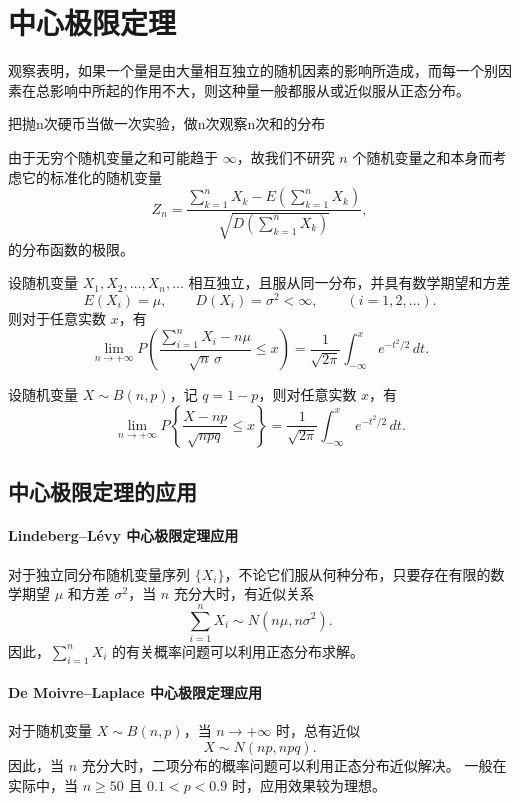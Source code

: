 \section{中心极限定理}
观察表明，如果一个量是由大量相互独立的随机因素的影响所造成，而每一个别因素在总影响中所起的作用不大，则这种量一般都服从或近似服从正态分布。
\begin{dxtips}
    把抛n次硬币当做一次实验，做n次观察n次和的分布
\end{dxtips}
由于无穷个随机变量之和可能趋于 $\infty$，故我们不研究 $n$ 个随机变量之和本身而考虑它的标准化的随机变量
\[
Z_n=\frac{\sum_{k=1}^n X_k - E\!\left(\sum_{k=1}^n X_k\right)}
{\sqrt{D\!\left(\sum_{k=1}^n X_k\right)}},
\]
的分布函数的极限。
\begin{theorem}
设随机变量 $X_1,X_2,\ldots,X_n,\ldots$ 相互独立，且服从同一分布，并具有数学期望和方差
\[
E(X_i)=\mu,\qquad D(X_i)=\sigma^2<\infty,\qquad (i=1,2,\ldots).
\]
则对于任意实数 $x$，有
\[
\lim_{n\to+\infty}
P\!\left(
\frac{\sum_{i=1}^n X_i-n\mu}{\sqrt{n}\,\sigma}
\le x
\right)
=
\frac{1}{\sqrt{2\pi}}
\int_{-\infty}^{x} e^{-t^2/2}\,dt.
\]
\end{theorem}
\begin{theorem}
设随机变量 $X\sim B(n,p)$，记 $q=1-p$，则对任意实数 $x$，有
\[
\lim_{n\to+\infty}
P\!\left\{
\frac{X-np}{\sqrt{npq}}\le x
\right\}
=
\frac{1}{\sqrt{2\pi}}
\int_{-\infty}^{x} e^{-t^{2}/2}\,dt .
\]
\end{theorem}

\subsection*{中心极限定理的应用}

\paragraph{Lindeberg--L\'evy 中心极限定理应用}
对于独立同分布随机变量序列 $\{X_i\}$，不论它们服从何种分布，只要存在有限的数学期望 $\mu$ 和方差 $\sigma^2$，当 $n$ 充分大时，有近似关系
\[
\sum_{i=1}^{n} X_i \sim N(n\mu,n\sigma^2).
\]
因此，$\sum_{i=1}^{n} X_i$ 的有关概率问题可以利用正态分布求解。

\paragraph{De Moivre--Laplace 中心极限定理应用}
对于随机变量 $X\sim B(n,p)$，当 $n\to+\infty$ 时，总有近似
\[
X \sim N(np,npq).
\]
因此，当 $n$ 充分大时，二项分布的概率问题可以利用正态分布近似解决。
一般在实际中，当 $n\ge 50$ 且 $0.1<p<0.9$ 时，应用效果较为理想。